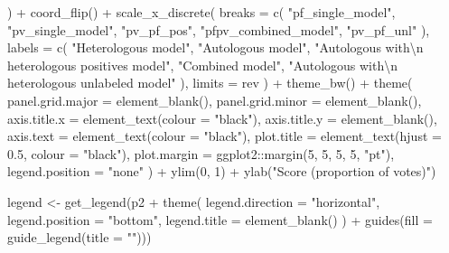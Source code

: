 \documentclass[
  11pt,
  oneside]{book}
\newenvironment{Shaded}{\begin{snugshade}}{\end{snugshade}}
\newcommand{\AttributeTok}[1]{\textcolor[rgb]{0.77,0.63,0.00}{#1}}
\newcommand{\DecValTok}[1]{\textcolor[rgb]{0.00,0.00,0.81}{#1}}
\newcommand{\FloatTok}[1]{\textcolor[rgb]{0.00,0.00,0.81}{#1}}
\newcommand{\FunctionTok}[1]{\textcolor[rgb]{0.00,0.00,0.00}{#1}}
\newcommand{\NormalTok}[1]{#1}
\newcommand{\OtherTok}[1]{\textcolor[rgb]{0.56,0.35,0.01}{#1}}
\newcommand{\SpecialCharTok}[1]{\textcolor[rgb]{0.00,0.00,0.00}{#1}}
\newcommand{\StringTok}[1]{\textcolor[rgb]{0.31,0.60,0.02}{#1}}
\begin{document}
\begin{Shaded}
\begin{Highlighting}[]
\NormalTok{  ) }\SpecialCharTok{+}
  \FunctionTok{coord\_flip}\NormalTok{() }\SpecialCharTok{+}
  \FunctionTok{scale\_x\_discrete}\NormalTok{(}
    \AttributeTok{breaks =} \FunctionTok{c}\NormalTok{(}
      \StringTok{"pf\_single\_model"}\NormalTok{, }\StringTok{"pv\_single\_model"}\NormalTok{, }\StringTok{"pv\_pf\_pos"}\NormalTok{,}
      \StringTok{"pfpv\_combined\_model"}\NormalTok{, }\StringTok{"pv\_pf\_unl"}
\NormalTok{    ),}
    \AttributeTok{labels =} \FunctionTok{c}\NormalTok{(}
      \StringTok{"Heterologous model"}\NormalTok{, }\StringTok{"Autologous model"}\NormalTok{,}
      \StringTok{"Autologous with}\SpecialCharTok{\textbackslash{}n}\StringTok{ heterologous positives model"}\NormalTok{,}
      \StringTok{"Combined model"}\NormalTok{,}
      \StringTok{"Autologous with}\SpecialCharTok{\textbackslash{}n}\StringTok{ heterologous unlabeled model"}
\NormalTok{    ),}
    \AttributeTok{limits =}\NormalTok{ rev}
\NormalTok{  ) }\SpecialCharTok{+}
  \FunctionTok{theme\_bw}\NormalTok{() }\SpecialCharTok{+}
  \FunctionTok{theme}\NormalTok{(}
    \AttributeTok{panel.grid.major =} \FunctionTok{element\_blank}\NormalTok{(),}
    \AttributeTok{panel.grid.minor =} \FunctionTok{element\_blank}\NormalTok{(),}
    \AttributeTok{axis.title.x =} \FunctionTok{element\_text}\NormalTok{(}\AttributeTok{colour =} \StringTok{"black"}\NormalTok{),}
    \AttributeTok{axis.title.y =} \FunctionTok{element\_blank}\NormalTok{(),}
    \AttributeTok{axis.text =} \FunctionTok{element\_text}\NormalTok{(}\AttributeTok{colour =} \StringTok{"black"}\NormalTok{),}
    \AttributeTok{plot.title =} \FunctionTok{element\_text}\NormalTok{(}\AttributeTok{hjust =} \FloatTok{0.5}\NormalTok{, }\AttributeTok{colour =} \StringTok{"black"}\NormalTok{),}
    \AttributeTok{plot.margin =}\NormalTok{ ggplot2}\SpecialCharTok{::}\FunctionTok{margin}\NormalTok{(}\DecValTok{5}\NormalTok{, }\DecValTok{5}\NormalTok{, }\DecValTok{5}\NormalTok{, }\DecValTok{5}\NormalTok{, }\StringTok{"pt"}\NormalTok{),}
    \AttributeTok{legend.position =} \StringTok{"none"}
\NormalTok{  ) }\SpecialCharTok{+}
  \FunctionTok{ylim}\NormalTok{(}\DecValTok{0}\NormalTok{, }\DecValTok{1}\NormalTok{) }\SpecialCharTok{+}
  \FunctionTok{ylab}\NormalTok{(}\StringTok{"Score (proportion of votes)"}\NormalTok{)}

\NormalTok{legend }\OtherTok{\textless{}{-}} \FunctionTok{get\_legend}\NormalTok{(p2 }\SpecialCharTok{+}
  \FunctionTok{theme}\NormalTok{(}
    \AttributeTok{legend.direction =} \StringTok{"horizontal"}\NormalTok{,}
    \AttributeTok{legend.position =} \StringTok{"bottom"}\NormalTok{,}
    \AttributeTok{legend.title =} \FunctionTok{element\_blank}\NormalTok{()}
\NormalTok{  ) }\SpecialCharTok{+}
  \FunctionTok{guides}\NormalTok{(}\AttributeTok{fill =} \FunctionTok{guide\_legend}\NormalTok{(}\AttributeTok{title =} \StringTok{""}\NormalTok{)))}
\end{Highlighting}
\end{Shaded}
\end{document}
